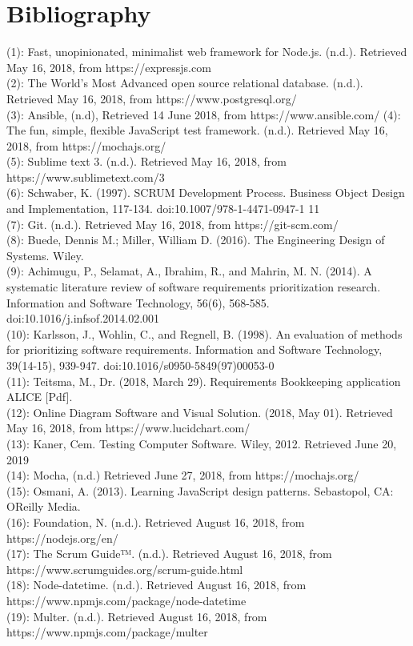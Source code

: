 \documentclass[paper=a4, fontsize=11pt,twoside]{scrartcl}	%
\begin{document}
\section{Bibliography}
(1): Fast, unopinionated, minimalist web framework for Node.js. (n.d.). Retrieved May 16, 2018, from https://expressjs.com \\ 
(2): The World's Most Advanced open source relational database. (n.d.). Retrieved May 16, 2018, from https://www.postgresql.org/ \\
(3): Ansible, (n.d), Retrieved 14 June 2018, from https://www.ansible.com/
(4): The fun, simple, flexible JavaScript test framework. (n.d.). Retrieved May 16, 2018, from https://mochajs.org/ \\
(5): Sublime text 3. (n.d.). Retrieved May 16, 2018, from https://www.sublimetext.com/3 \\
(6): Schwaber, K. (1997). SCRUM Development Process. Business Object Design and Implementation, 117-134. doi:10.1007/978-1-4471-0947-1 11\\ 
(7): Git. (n.d.). Retrieved May 16, 2018, from https://git-scm.com/ \\
(8): Buede, Dennis M.; Miller, William D. (2016). The Engineering Design of Systems. Wiley. \\
(9): Achimugu, P., Selamat, A., Ibrahim, R., and Mahrin, M. N. (2014). A systematic literature review of software requirements prioritization research. Information and Software Technology, 56(6), 568-585. doi:10.1016/j.infsof.2014.02.001 \\
(10): Karlsson, J., Wohlin, C., and Regnell, B. (1998). An evaluation of methods for prioritizing software requirements. Information and Software Technology, 39(14-15), 939-947. doi:10.1016/s0950-5849(97)00053-0 \\
(11): Teitsma, M., Dr. (2018, March 29). Requirements Bookkeeping application ALICE [Pdf]. \\
(12): Online Diagram Software and Visual Solution. (2018, May 01). Retrieved May 16, 2018, from https://www.lucidchart.com/ \\
(13): Kaner, Cem. Testing Computer Software. Wiley, 2012.
 Retrieved June 20, 2019 \\
(14): Mocha, (n.d.) Retrieved June 27, 2018, from https://mochajs.org/ \\
(15): Osmani, A. (2013). Learning JavaScript design patterns. Sebastopol, CA: OReilly Media. \\
(16): Foundation, N. (n.d.). Retrieved August 16, 2018, from https://nodejs.org/en/ \\
(17): The Scrum Guide™. (n.d.). Retrieved August 16, 2018, from https://www.scrumguides.org/scrum-guide.html \\
(18): Node-datetime. (n.d.). Retrieved August 16, 2018, from https://www.npmjs.com/package/node-datetime \\
(19): Multer. (n.d.). Retrieved August 16, 2018, from https://www.npmjs.com/package/multer
\end{document}
